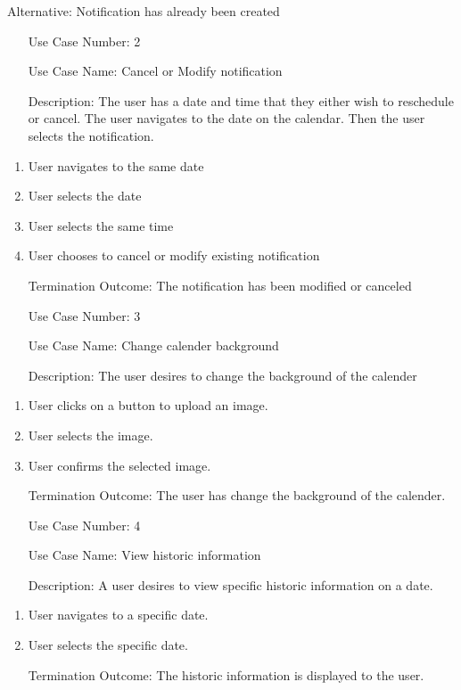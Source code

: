 \documentclass[10pt,conference,onecolumn,compsoc]{IEEEtran}
\begin{document}
Alternative: Notification has already been created
\begin{itemize}
\item[Use Case Number:]  2
\item[Use Case Name:] Cancel or Modify notification
\item[Description:] The user has a date and time that they either wish to reschedule or cancel. The user navigates to the date on the calendar. Then the user selects the notification.
\end{itemize}

\begin{enumerate}
\item User navigates to the same date
\item User selects the date
\item User selects the same time
\item User chooses to cancel or modify existing notification
\item[Termination Outcome:] The notification has been modified or canceled
\end{enumerate}

\begin{itemize}
\item[Use Case Number:]3
\item[Use Case Name:] Change calender background
\item[Description:] The user desires to change the background of the calender
\end{itemize}

\begin{enumerate}
\item User clicks on a button to upload an image.
\item User selects the image.
\item User confirms the selected image.
\item[Termination Outcome:] The user has change the background of the calender.
\end{enumerate}

\begin{itemize}
\item[Use Case Number:]4
\item[Use Case Name:] View historic information
\item[Description:] A user desires to view specific historic information on a date.
\end{itemize}

\begin{enumerate}
\item User navigates to a specific date.
\item User selects the specific date.
\item[Termination Outcome:] The historic information is displayed to the user.
\end{enumerate}
\end{document}
